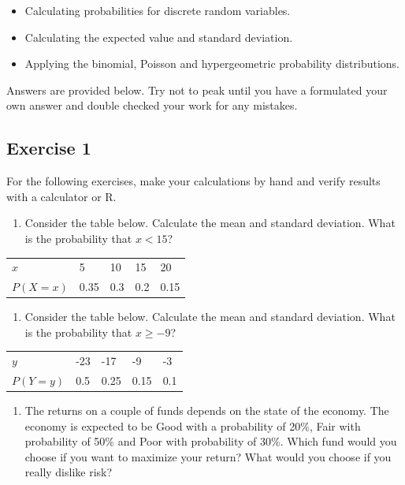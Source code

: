 \documentclass[
  letterpaper,
  DIV=11,
  numbers=noendperiod]{scrreprt}
\providecommand{\tightlist}{%
  \setlength{\itemsep}{0pt}\setlength{\parskip}{0pt}}\usepackage{longtable,booktabs,array}
\begin{document}
\begin{itemize}
\item
  Calculating probabilities for discrete random variables.
\item
  Calculating the expected value and standard deviation.
\item
  Applying the binomial, Poisson and hypergeometric probability
  distributions.
\end{itemize}

Answers are provided below. Try not to peak until you have a formulated
your own answer and double checked your work for any mistakes.

\hypertarget{exercise-1-16}{%
\subsection*{Exercise 1}\label{exercise-1-16}}

For the following exercises, make your calculations by hand and verify
results with a calculator or R.

\begin{enumerate}
\def\labelenumi{\arabic{enumi}.}
\tightlist
\item
  Consider the table below. Calculate the mean and standard deviation.
  What is the probability that \(x<15\)?
\end{enumerate}

\begin{longtable}[]{@{}lllll@{}}
\toprule()
\endhead
\(x\) & 5 & 10 & 15 & 20 \\
\(P(X=x)\) & 0.35 & 0.3 & 0.2 & 0.15 \\
\bottomrule()
\end{longtable}

\begin{enumerate}
\def\labelenumi{\arabic{enumi}.}
\setcounter{enumi}{1}
\tightlist
\item
  Consider the table below. Calculate the mean and standard deviation.
  What is the probability that \(x\geq-9\)?
\end{enumerate}

\begin{longtable}[]{@{}lllll@{}}
\toprule()
\endhead
\(y\) & -23 & -17 & -9 & -3 \\
\(P(Y=y)\) & 0.5 & 0.25 & 0.15 & 0.1 \\
\bottomrule()
\end{longtable}

\begin{enumerate}
\def\labelenumi{\arabic{enumi}.}
\setcounter{enumi}{2}
\tightlist
\item
  The returns on a couple of funds depends on the state of the economy.
  The economy is expected to be Good with a probability of 20\%, Fair
  with probability of 50\% and Poor with probability of 30\%. Which fund
  would you choose if you want to maximize your return? What would you
  choose if you really dislike risk?
\end{enumerate}
\end{document}
